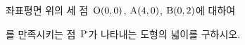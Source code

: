 좌표평면 위의 세 점~$\mathrm{O}(0{,}\mkern3mu\mathopen{}0)$, $\mathrm{A}(4{,}\mkern3mu\mathopen{}0)$, $\mathrm{B}(0{,}\mkern3mu\mathopen{}2)$에 대하여\par\smallskip{}\par\smallskip\noindent 를 만족시키는 점~$\mathrm{P}$가 나타내는 도형의 넓이를 구하시오.
